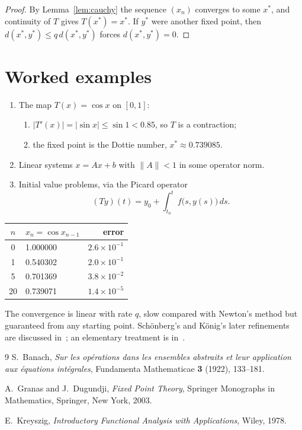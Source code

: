 \documentclass[a4paper,11pt]{article}
\newcommand{\abs}[1]{\left\lvert #1 \right\rvert}
\begin{document}
\begin{proof}
By Lemma~\ref{lem:cauchy} the sequence $(x_n)$ converges to some $x^\ast$, and
continuity of $T$ gives $T(x^\ast) = x^\ast$. If $y^\ast$ were another fixed
point, then $d(x^\ast, y^\ast) \le q\, d(x^\ast, y^\ast)$ forces
$d(x^\ast, y^\ast) = 0$.
\end{proof}

\section{Worked examples}

\begin{enumerate}
  \item The map $T(x) = \cos x$ on $[0, 1]$:
    \begin{enumerate}
      \item $\abs{T'(x)} = \abs{\sin x} \le \sin 1 < 0.85$, so $T$ is a contraction;
      \item the fixed point is the Dottie number, $x^\ast \approx 0.739085$.
    \end{enumerate}
  \item Linear systems $x = Ax + b$ with $\lVert A \rVert < 1$ in some operator norm.
  \item Initial value problems, via the Picard operator
    \[
      (Ty)(t) = y_0 + \int_{t_0}^{t} f\bigl(s, y(s)\bigr)\, ds .
    \]
\end{enumerate}

\begin{center}
  \begin{tabular}{|c|l|r|}
    \hline
    $n$ & $x_n = \cos x_{n-1}$ & error \\
    \hline
    0 & 1.000000 & $2.6 \times 10^{-1}$ \\
    1 & 0.540302 & $2.0 \times 10^{-1}$ \\
    5 & 0.701369 & $3.8 \times 10^{-2}$ \\
    20 & 0.739071 & $1.4 \times 10^{-5}$ \\
    \hline
  \end{tabular}
\end{center}

The convergence is linear with rate $q$, slow compared with Newton's method
but guaranteed from any starting point. Sch\"onberg's and K\"onig's later
refinements are discussed in~\cite{granas2003}; an elementary treatment is
in~\cite{kreyszig1978}.

\begin{thebibliography}{9}
  S.~Banach,
  \emph{Sur les op\'erations dans les ensembles abstraits et leur application aux \'equations int\'egrales},
  Fundamenta Mathematicae \textbf{3} (1922), 133--181.

  A.~Granas and J.~Dugundji,
  \emph{Fixed Point Theory},
  Springer Monographs in Mathematics, Springer, New York, 2003.

  E.~Kreyszig,
  \emph{Introductory Functional Analysis with Applications},
  Wiley, 1978.
\end{thebibliography}
\end{document}
